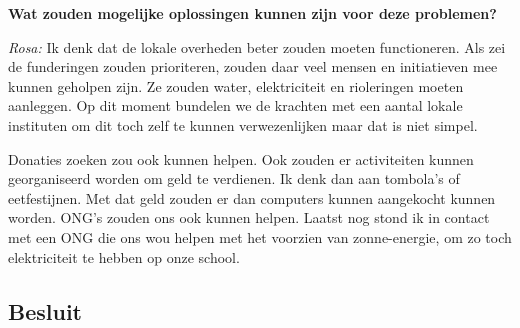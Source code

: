 \textbf{Wat zouden mogelijke oplossingen kunnen zijn voor deze problemen?}

\textit{Rosa:} Ik denk dat de lokale overheden beter zouden moeten functioneren. Als zei de funderingen zouden prioriteren, zouden daar veel mensen en initiatieven mee kunnen geholpen zijn. Ze zouden water, elektriciteit en rioleringen moeten aanleggen. Op dit moment bundelen we de krachten met een aantal lokale instituten om dit toch zelf te kunnen verwezenlijken maar dat is niet simpel. 

Donaties zoeken zou ook kunnen helpen. Ook zouden er activiteiten kunnen georganiseerd worden om geld te verdienen. Ik denk dan aan tombola's of eetfestijnen. Met dat geld zouden er dan computers kunnen aangekocht kunnen worden. ONG's zouden ons ook kunnen helpen. Laatst nog stond ik in contact met een ONG die ons wou helpen met het voorzien van zonne-energie, om zo toch elektriciteit te hebben op onze school.

\subsection{Besluit}

